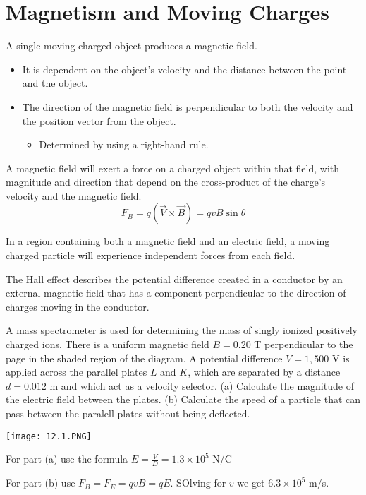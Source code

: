 \documentclass[../em.tex]{subfiles}
\begin{document}
\section{Magnetism and Moving Charges}
A single moving charged object produces a magnetic field.
\begin{itemize}
    \item It is dependent on the object's velocity and the distance between the point and the object.
    \item The direction of the magnetic field is perpendicular to both the velocity and the position vector from the object. 
    \begin{itemize}
        \item Determined by using a right-hand rule.
    \end{itemize}
\end{itemize}

A magnetic field will exert a force on a charged object within that field, with magnitude and direction that depend on the cross-product of the charge's velocity and the magnetic field.
\[ F_B = q(\vec{V}\times \vec{B})=qvB\sin\theta \]

In a region containing both a magnetic field and an electric field, a moving charged particle will experience independent forces from each field.

The Hall effect describes the potential difference created in a conductor by an external magnetic field that has a component perpendicular to the direction of charges moving in the conductor.

\begin{example}
    A mass spectrometer is used for determining the mass of singly ionized positively charged ions. There is a uniform magnetic field $B=0.20$ T perpendicular to the page in the shaded region of the diagram. 
    A potential difference $V=1,500$ V is applied across the parallel plates $L$ and $K$, which are separated by a distance $d=0.012$ m and which act as a velocity selector. 
    (a) Calculate the magnitude of the electric field between the plates. (b) Calculate the speed of a particle that can pass between the paralell plates without being deflected.

    \begin{center}
        \texttt{[image: 12.1.PNG]}
    \end{center}

    For part (a) use the formula $E=\frac{V}{D}=1.3\times 10^5$ N/C 

    For part (b) use $F_B=F_E = qvB=qE$. SOlving for $v$ we get $6.3\times 10^5$ m/s.
\end{example}
\end{document}
